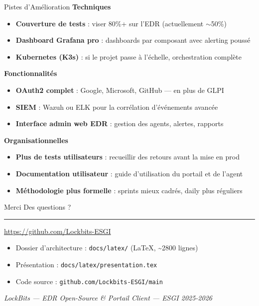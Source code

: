 \documentclass[xcolor=dvipsnames, aspectratio=169, 10pt]{beamer}
\newcommand{\bitem}{\item[$\bullet$]}
\begin{document}
\begin{frame}{Pistes d'Amélioration}
  \textbf{Techniques}
  \begin{itemize}
    \bitem \textbf{Couverture de tests} : viser 80\%+ sur l'EDR (actuellement $\sim$50\%)
    \bitem \textbf{Dashboard Grafana pro} : dashboards par composant avec alerting poussé
    \bitem \textbf{Kubernetes (K3s)} : si le projet passe à l'échelle, orchestration complète
  \end{itemize}
  \vspace{0.2cm}
  \textbf{Fonctionnalités}
  \begin{itemize}
    \bitem \textbf{OAuth2 complet} : Google, Microsoft, GitHub — en plus de GLPI
    \bitem \textbf{SIEM} : Wazuh ou ELK pour la corrélation d'événements avancée
    \bitem \textbf{Interface admin web EDR} : gestion des agents, alertes, rapports
  \end{itemize}
  \vspace{0.2cm}
  \textbf{Organisationnelles}
  \begin{itemize}
    \bitem \textbf{Plus de tests utilisateurs} : recueillir des retours avant la mise en prod
    \bitem \textbf{Documentation utilisateur} : guide d'utilisation du portail et de l'agent
    \bitem \textbf{Méthodologie plus formelle} : sprints mieux cadrés, daily plus réguliers
  \end{itemize}
\end{frame}

\begin{frame}{Merci}
  \vspace{1.5em}
  \centering
  {\Huge\color{primaryblue} Des questions ?}
  \vspace{1em}
  \rule{0.5\textwidth}{0.5pt}
  \vspace{1.5em}
  {\Large\url{https://github.com/Lockbits-ESGI}}
  \vspace{0.5em}
  \begin{itemize}
    \bitem Dossier d'architecture : \texttt{docs/latex/} (LaTeX, \textasciitilde2800 lignes)
    \bitem Présentation : \texttt{docs/latex/presentation.tex}
    \bitem Code source : \texttt{github.com/Lockbits-ESGI/main}
  \end{itemize}
  \vspace{1em}
  \small{\textit{LockBits — EDR Open-Source \& Portail Client — ESGI 2025-2026}}
\end{frame}
\end{document}
